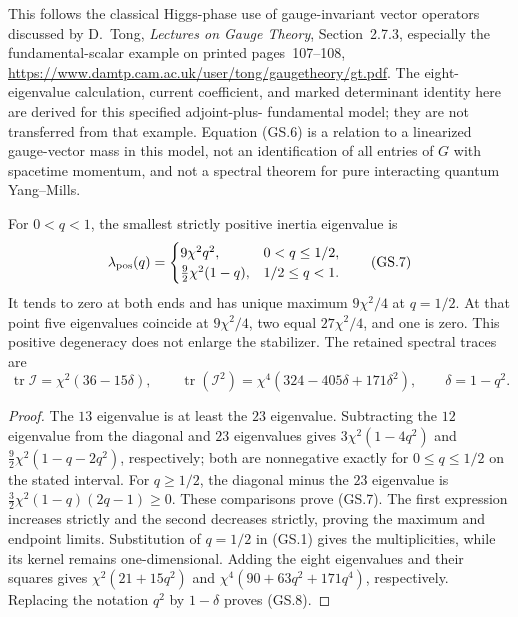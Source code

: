 This follows the classical Higgs-phase use of gauge-invariant vector
operators discussed by D.~Tong, \emph{Lectures on Gauge Theory},
Section~2.7.3, especially the fundamental-scalar example on printed
pages~107--108,
\url{https://www.damtp.cam.ac.uk/user/tong/gaugetheory/gt.pdf}.
The eight-eigenvalue calculation, current coefficient, and marked
determinant identity here are derived for this specified adjoint-plus-
fundamental model; they are not transferred from that example.
Equation (GS.6) is a relation to a linearized gauge-vector mass in this
model, not an identification of all entries of $G$ with spacetime momentum,
and not a spectral theorem for pure interacting quantum Yang--Mills.

\begin{corollary}
\label{q444:massive-branch-bound}
For $0<q<1$, the smallest strictly positive inertia eigenvalue is
\[
 \lambda_{\rm pos}(q)=
 \begin{cases}
 9\chi^2q^2,&0<q\leq1/2,\\
 \frac92\chi^2(1-q),&1/2\leq q<1 .
 \end{cases}                                                 \tag{GS.7}
\]
It tends to zero at both ends and has unique maximum $9\chi^2/4$
at $q=1/2$. At that point five eigenvalues coincide at $9\chi^2/4$,
two equal $27\chi^2/4$, and one is zero. This positive degeneracy
does not enlarge the stabilizer. The retained spectral traces are
\[
 \operatorname{tr}\mathscr I=\chi^2(36-15\delta),\qquad
 \operatorname{tr}(\mathscr I^2)
       =\chi^4(324-405\delta+171\delta^2),\qquad \delta=1-q^2.
                                                               \tag{GS.8}
\]
\end{corollary}
\begin{proof}
The $13$ eigenvalue is at least the $23$ eigenvalue. Subtracting the
$12$ eigenvalue from the diagonal and $23$ eigenvalues gives
$3\chi^2(1-4q^2)$ and
$\frac92\chi^2(1-q-2q^2)$, respectively; both are nonnegative
exactly for $0\leq q\leq1/2$ on the stated interval.
For $q\geq1/2$, the diagonal minus the $23$ eigenvalue is
$\frac32\chi^2(1-q)(2q-1)\geq0$.
These comparisons prove (GS.7). The first expression increases strictly
and the second decreases strictly, proving the maximum and endpoint
limits. Substitution of $q=1/2$ in (GS.1) gives the multiplicities,
while its kernel remains one-dimensional. Adding the eight eigenvalues
and their squares gives $\chi^2(21+15q^2)$ and
$\chi^4(90+63q^2+171q^4)$, respectively. Replacing the notation
$q^2$ by $1-\delta$ proves (GS.8).
\end{proof}

